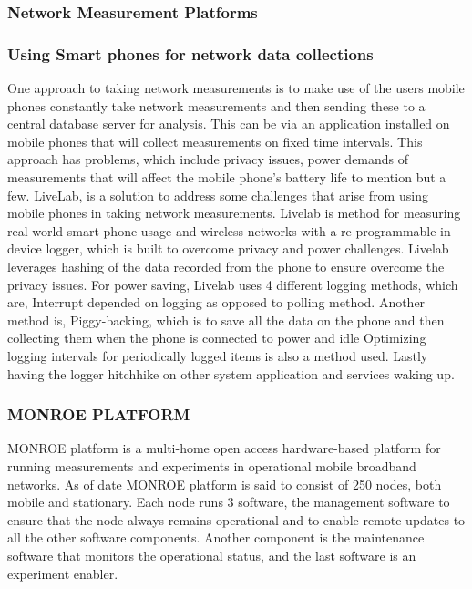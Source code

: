 \subsubsection{Network Measurement Platforms}\label{null:network-measurement-platforms}
\subsubsection{Using Smart phones for network data collections}
One approach to taking network measurements is to make use of the users mobile phones constantly take network measurements and then sending these to a central database server for analysis.
This can be via an application installed on mobile phones that will collect measurements on fixed time intervals.
This approach has problems, which include privacy issues, power demands of measurements that will affect the mobile phone's battery life to mention but a few.
LiveLab, is a solution to address some challenges that arise from using mobile phones in taking network measurements\cite{Shepard:2011:LMW:1925019.1925023}.
Livelab is method for measuring real-world smart phone usage and wireless networks with a re-programmable in device logger, which is built to overcome privacy and power challenges\cite{Wang:2015:MMA:2757290.2757291}.
Livelab leverages hashing of the data recorded from the phone to ensure overcome the privacy issues\cite{Shepard:2011:LMW:1925019.1925023}.
For power saving, Livelab uses 4 different logging methods, which are\cite{Shepard:2011:LMW:1925019.1925023}, Interrupt depended on logging as opposed to polling method.
Another method is, Piggy-backing, which is to save all the data on the phone and then collecting them when the phone is connected to power and idle
Optimizing logging intervals for periodically logged items is also a method used.
Lastly having the logger hitchhike on other system application and services waking up.

\subsubsection{MONROE PLATFORM}
MONROE platform is a multi-home open access hardware-based platform for running measurements and experiments in operational mobile broadband networks\cite{7523537}.
As of date MONROE platform is said to consist of 250 nodes, both mobile and stationary\cite{8002921}.
Each node runs 3 software, the management software to ensure that the node  always remains operational and to enable remote updates to all the other software components.
Another component is the maintenance software that monitors the operational status, and the last software is an experiment enabler\cite{8002921}.
